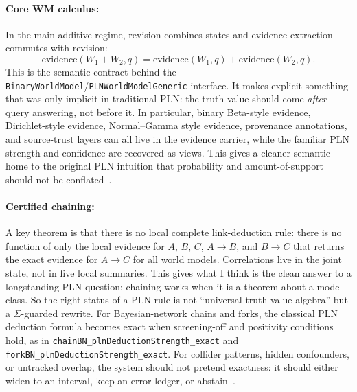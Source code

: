 \documentclass{easychair}
\newcommand{\code}[1]{\texttt{#1}}
\begin{document}
\paragraph*{Core WM calculus:}
In the main additive regime, revision combines states and evidence extraction commutes with revision:
\[
  \mathrm{evidence}(W_1 + W_2,q)
  = \mathrm{evidence}(W_1,q) + \mathrm{evidence}(W_2,q).
\]
This is the semantic contract behind the \code{BinaryWorldModel}/\code{PLNWorldModelGeneric} interface.  It makes explicit something that was only implicit in traditional PLN: the truth value should come \emph{after} query answering, not before it.  In particular, binary Beta-style evidence, Dirichlet-style evidence, Normal--Gamma style evidence, provenance annotations, and source-trust layers can all live in the evidence carrier, while the familiar PLN strength and confidence are recovered as views.  This gives a cleaner semantic home to the original PLN intuition that probability and amount-of-support should not be conflated~\cite{plnbook,knuthskilling}.

\vspace{-3mm}
\paragraph*{Certified chaining:}
A key theorem is that there is no local complete link-deduction rule: there is no function of only the local evidence for $A$, $B$, $C$, $A \rightarrow B$, and $B \rightarrow C$ that returns the exact evidence for $A \rightarrow C$ for all world models.  Correlations live in the joint state, not in five local summaries.  This gives what I think is the clean answer to a longstanding PLN question: chaining works when it is a theorem about a model class.  So the right status of a PLN rule is not ``universal truth-value algebra'' but a $\Sigma$-guarded rewrite.  For Bayesian-network chains and forks, the classical PLN deduction formula becomes exact when screening-off and positivity conditions hold, as in \code{chainBN\_plnDeductionStrength\_exact} and \code{forkBN\_plnDeductionStrength\_exact}.  For collider patterns, hidden confounders, or untracked overlap, the system should not pretend exactness: it should either widen to an interval, keep an error ledger, or abstain~\cite{pearl,halpern}.

\vspace{-3mm}
\end{document}
